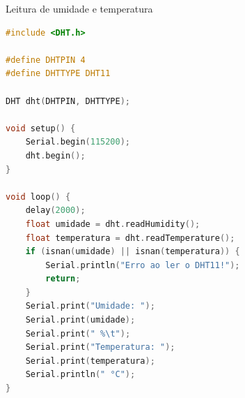 \begin{frame}[fragile]{Leitura de umidade e temperatura}
\begin{lstlisting}[language=C, basicstyle=\tiny\ttfamily]
#include <DHT.h>

#define DHTPIN 4        
#define DHTTYPE DHT11

DHT dht(DHTPIN, DHTTYPE);

void setup() {
    Serial.begin(115200);
    dht.begin();
}

void loop() {
    delay(2000);
    float umidade = dht.readHumidity();
    float temperatura = dht.readTemperature();
    if (isnan(umidade) || isnan(temperatura)) {
        Serial.println("Erro ao ler o DHT11!");
        return;
    }
    Serial.print("Umidade: ");
    Serial.print(umidade);
    Serial.print(" %\t");
    Serial.print("Temperatura: ");
    Serial.print(temperatura);
    Serial.println(" °C");
}
    
\end{lstlisting}
\end{frame}


